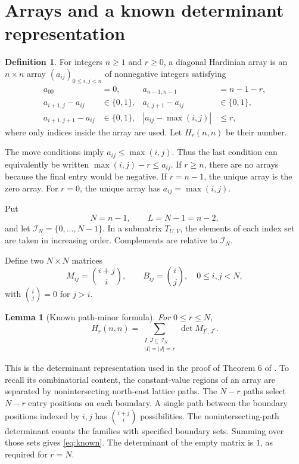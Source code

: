\documentclass[11pt]{article}
\numberwithin{equation}{section}
\newtheorem{lemma}[lemma]{Lemma}
\theoremstyle{definition}
\newtheorem{definition}[definition]{Definition}
\begin{document}
\section{Arrays and a known determinant representation}\label{sec:arrays}

\begin{definition}
For integers $n\geq1$ and $r\geq0$, a diagonal Hardinian array is an $n\times n$ array $(a_{ij})_{0\leq i,j<n}$ of nonnegative integers satisfying
\begin{align*}
 a_{00}&=0, &a_{n-1,n-1}&=n-1-r,\\
 a_{i+1,j}-a_{ij}&\in\{0,1\},&
 a_{i,j+1}-a_{ij}&\in\{0,1\},\\
 a_{i+1,j+1}-a_{ij}&\in\{0,1\},&
 |a_{ij}-\max(i,j)|&\leq r,
\end{align*}
where only indices inside the array are used. Let $H_r(n,n)$ be their number.
\end{definition}

The move conditions imply $a_{ij}\leq\max(i,j)$. Thus the last condition can equivalently be written $\max(i,j)-r\leq a_{ij}$. If $r\geq n$, there are no arrays because the final entry would be negative. If $r=n-1$, the unique array is the zero array. For $r=0$, the unique array has $a_{ij}=\max(i,j)$.

Put
\begin{equation}\label{eq:N-L}
 N=n-1,\qquad L=N-1=n-2,
\end{equation}
and let $\mathcal I_N=\{0,\ldots,N-1\}$. In a submatrix $T_{U,V}$, the elements of each index set are taken in increasing order. Complements are relative to $\mathcal I_N$.

Define two $N\times N$ matrices
\begin{equation}\label{eq:MB}
 M_{ij}=\binom{i+j}{i},\qquad B_{ij}=\binom{i}{j},
 \quad 0\leq i,j<N,
\end{equation}
with $\binom{i}{j}=0$ for $j>i$.

\begin{lemma}[Known path-minor formula]\label{lem:known}
For $0\leq r\leq N$,
\begin{equation}\label{eq:known}
 H_r(n,n)=\sum_{\substack{I,J\subseteq\mathcal I_N\\ |I|=|J|=r}}
              \det M_{I^c,J^c}.
\end{equation}
\end{lemma}

This is the determinant representation used in the proof of Theorem 6 of \cite{DK}. To recall its combinatorial content, the constant-value regions of an array are separated by nonintersecting north-east lattice paths. The $N-r$ paths select $N-r$ entry positions on each boundary. A single path between the boundary positions indexed by $i,j$ has $\binom{i+j}{i}$ possibilities. The nonintersecting-path determinant counts the families with specified boundary sets. Summing over those sets gives \eqref{eq:known}. The determinant of the empty matrix is $1$, as required for $r=N$.
\end{document}
